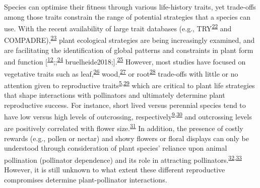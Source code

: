 \documentclass[
  12pt,
  a4paper,
]{article}
\begin{document}
Species can optimise their fitness through various life-history traits, yet trade-offs among those traits constrain the range of potential strategies that a species can use. With the recent availability of large trait databases (e.g., TRY\textsuperscript{\protect\hyperlink{ref-kattge2011}{22}} and COMPADRE),\textsuperscript{\protect\hyperlink{ref-salguero2015}{23}} plant ecological strategies are being increasingly examined, and are facilitating the identification of global patterns and constraints in plant form and function {[}\textsuperscript{\protect\hyperlink{ref-salguero2016}{12}};;\textsuperscript{\protect\hyperlink{ref-diaz2016}{24}} bruelheide2018;{]}.\textsuperscript{\protect\hyperlink{ref-carmona2021}{25}} However, most studies have focused on vegetative traits such as leaf,\textsuperscript{\protect\hyperlink{ref-wright2004}{26}} wood,\textsuperscript{\protect\hyperlink{ref-chave2009}{27}} or root\textsuperscript{\protect\hyperlink{ref-laughlin2021}{28}} trade-offs with little or no attention given to reproductive traits\textsuperscript{\protect\hyperlink{ref-roddy2021}{5},\protect\hyperlink{ref-evojtko2020}{29}} which are critical to plant life strategies that shape interactions with pollinators and ultimately determine plant reproductive success. For instance, short lived versus perennial species tend to have low versus high levels of outcrossing, respectively\textsuperscript{\protect\hyperlink{ref-moeller2017}{9},\protect\hyperlink{ref-barrett2003}{30}} and outcrossing levels are positively correlated with flower size.\textsuperscript{\protect\hyperlink{ref-goodwillie2010}{31}} In addition, the presence of costly rewards (e.g., pollen or nectar) and showy flowers or floral displays can only be understood through consideration of plant species' reliance upon animal pollination (pollinator dependence) and its role in attracting pollinators.\textsuperscript{\protect\hyperlink{ref-ollerton2011}{32},\protect\hyperlink{ref-rodger2021}{33}} However, it is still unknown to what extent these different reproductive compromises determine plant-pollinator interactions.
\end{document}
